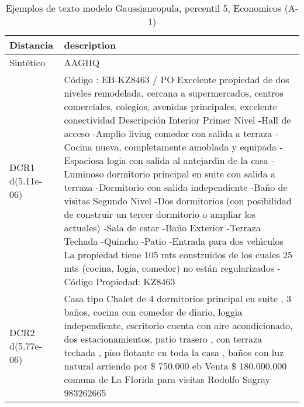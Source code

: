 \begin{table}[H]
\centering
\fontsize{10}{14}\selectfont
\caption{Ejemplos de texto modelo Gaussiancopula, percentil 5, Economicos (A-1)}
\label{table-example-economicos-a-1-gaussiancopula-5p-text}
\begin{tabular}{|l|m{35em}|}
\hline
\rowcolor[gray]{0.8}
Distancia & description \\
\hline Sintético & AAGHQ \\
\hline DCR1 d(5.11e-06) & C\'odigo : EB-KZ8463 / PO  Excelente propiedad de dos niveles remodelada, cercana a supermercados, centros comerciales, colegios, avenidas principales, excelente conectividad  Descripci\'on Interior Primer Nivel -Hall de acceso -Amplio living comedor con salida a terraza -Cocina nueva, completamente amoblada y equipada -Espaciosa logia con salida al antejard{\'\i}n de la casa -Luminoso dormitorio principal en suite con salida a terraza -Dormitorio con salida independiente -Ba\~no de visitas  Segundo Nivel -Dos dormitorios (con posibilidad de construir un tercer dormitorio o ampliar los actuales) -Sala de estar -Ba\~no  Exterior -Terraza Techada -Quincho -Patio -Entrada para dos veh{\'\i}culos  La propiedad tiene 105 mts construidos de los cuales 25 mts (cocina, logia, comedor) no est\'an regularizados - C\'odigo Propiedad: KZ8463 \\
\hline DCR2 d(5.77e-06) & Casa tipo Chalet de 4 dormitorios principal en suite , 3 ba\~nos, cocina con comedor de diario, loggia independiente, escritorio cuenta con aire acondicionado, dos estacionamientos, patio trasero , con terraza techada , piso flotante en toda la casa , ba\~nos con luz natural arriendo por \$ 750.000 eb Venta \$ 180.000.000 comuna de La Florida para visitas Rodolfo Sagray 983262665 \\
\hline
\end{tabular}
\end{table}
